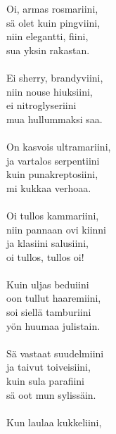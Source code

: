 
            Oi, armas rosmariini, \\
            sä olet kuin pingviini, \\
            niin elegantti, fiini, \\
            sua yksin rakastan. \\
\hspace{10mm} \\
            Ei sherry, brandyviini, \\
            niin nouse hiuksiini, \\
            ei nitroglyseriini \\
            mua hullummaksi saa. \\
\hspace{10mm} \\
            On kasvois ultramariini, \\
            ja vartalos serpentiini \\
            kuin punakreptosiini, \\
            mi kukkaa verhoaa. \\
\hspace{10mm} \\
            Oi tullos kammariini, \\
            niin pannaan ovi kiinni \\
            ja klasiini salusiini, \\
            oi tullos, tullos oi! \\
\hspace{10mm} \\
            Kuin uljas beduiini \\
            oon tullut haaremiini, \\
            soi siellä tamburiini \\
            yön huumaa julistain. \\
\hspace{10mm} \\
            Sä vastaat suudelmiini \\
            ja taivut toiveisiini, \\
            kuin sula parafiini \\
            sä oot mun sylissäin. \\
\hspace{10mm} \\
            Kun laulaa kukkeliini, \\
